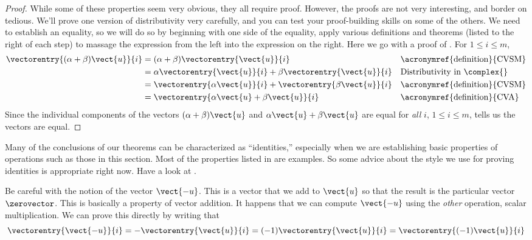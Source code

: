 %
\begin{proof}
While some of these properties seem very obvious, they all require proof.  However, the proofs are not very interesting, and border on tedious. We'll prove one version of distributivity very carefully, and you can test your proof-building skills on some of the others.  We need to establish an equality, so we will do so by beginning with one side of the equality, apply various definitions and theorems (listed to the right of each step) to massage the expression from the left into the expression on the right.   Here we go with a proof of .   For $1\leq i\leq m$,
%
\begin{align*}
\vectorentry{(\alpha+\beta)\vect{u}}{i}
&=(\alpha+\beta)\vectorentry{\vect{u}}{i}
&&\text{\acronymref{definition}{CVSM}}\\
%
&=\alpha\vectorentry{\vect{u}}{i}+\beta\vectorentry{\vect{u}}{i}
&&\text{Distributivity in $\complex{\null}$}\\
%
&=\vectorentry{\alpha\vect{u}}{i}+\vectorentry{\beta\vect{u}}{i}
&&\text{\acronymref{definition}{CVSM}}\\
%
&=\vectorentry{\alpha\vect{u}+\beta\vect{u}}{i}
&&\text{\acronymref{definition}{CVA}}\\
%
\end{align*}
%
Since the individual components of the vectors $(\alpha+\beta)\vect{u}$ and $\alpha\vect{u}+\beta\vect{u}$ are equal for {\em all} $i$, $1\leq i\leq m$,  tells us the vectors are equal.
%
\end{proof}
%
Many of the conclusions of our theorems can be characterized as ``identities,''  especially when we are establishing basic properties of operations such as those in this section.  Most of the properties listed in  are examples.
%
{So some advice about the style we use for proving identities is appropriate right now.}
{Have a look at .}
\par
%
Be careful with the notion of the vector $\vect{-u}$.  This is a vector that we add to $\vect{u}$ so that the result is the particular vector $\zerovector$.  This is basically a property of vector addition.  It happens that we can compute $\vect{-u}$ using the {\em other} operation, scalar multiplication.  We can prove this directly by writing that
%
\begin{equation*}
\vectorentry{\vect{-u}}{i}
=-\vectorentry{\vect{u}}{i}
=(-1)\vectorentry{\vect{u}}{i}
=\vectorentry{(-1)\vect{u}}{i}
\end{equation*}
